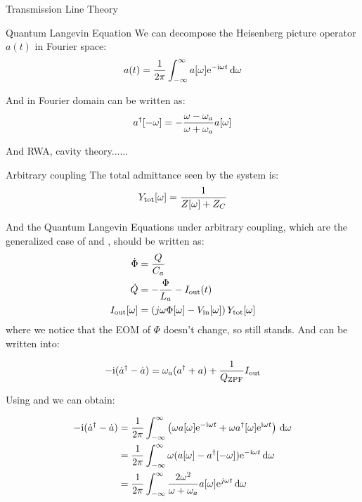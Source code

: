 \begin{section}{Transmission Line Theory}
\begin{subsection}{Quantum Langevin Equation}
We can decompose the Heisenberg picture operator $a(t)$ in Fourier space: 
\begin{equation}\label{eq:aFT}
a(t) = \frac{1}{2\pi} \integral{a[\omega] \exp{- \ii \omega t}}{\omega}{-\inf}{\inf}
\end{equation} 

And  in Fourier domain can be written as: 
\begin{equation}\label{eq:a2}
\ad[-\omega] = -\frac{\omega-\omega_a}{\omega+\omega_a} a[\omega]
\end{equation}



And RWA, cavity theory......

\end{subsection}



\begin{subsection}{Arbitrary coupling}
The total admittance seen by the system is: 
\begin{equation}\label{eq:Ytot}
Y_\tot[\omega] = \frac{1}{Z[\omega]+Z_C}
\end{equation}


And the Quantum Langevin Equations under arbitrary coupling, which are the generalized case of  and , should be written as: 
\begin{align}
\dot{\Phi} &= \frac{Q}{C_a} \label{eq:Phidot} \\
\dot{Q} &= -\frac{\Phi}{L_a} - I_\out(t) \label{eq:Qdot}\\
I_\out[\omega] &= \left(j \omega \Phi[\omega] - V_\in[\omega]  \right) Y_\tot[\omega] \label{eq:Iout}
\end{align}
where we notice that the EOM of $\Phi$ doesn't change, so  still stands. And  can be written into: 

\begin{equation}\label{eq:a3}
- \ii (\dot{a}^\dagger - \dot{a}) = \omega_a (\ad + a) + \frac{1}{Q_\ZPF} I_\out
\end{equation}

Using  and  we can obtain: 

\begin{equation}
\begin{aligned}
- \ii (\dot{a}^\dagger - \dot{a}) &= \frac{1}{2\pi}\integral{\left(\omega a[\omega] \exp{-\ii \omega t} + \omega a^\dagger[\omega] \exp{\ii \omega t}\right)}{\omega}{-\inf}{\inf} \\
&= \frac{1}{2\pi}\integral{\omega ( a[\omega] - a^\dagger[- \omega] )\exp{- \ii \omega t}}{\omega}{-\inf}{\inf} \\
&= \frac{1}{2\pi}\integral{ \frac{2\omega^2}{\omega + \omega_a} a[\omega] \exp{j \omega t}}{\omega}{-\inf}{\inf}
\end{aligned}
\end{equation}


\end{subsection}
\end{section}
